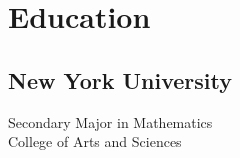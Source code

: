 
\section{Education} 
\subsection{New York University}

Secondary Major in Mathematics \\
College of Arts and Sciences\\
\sectionsep
